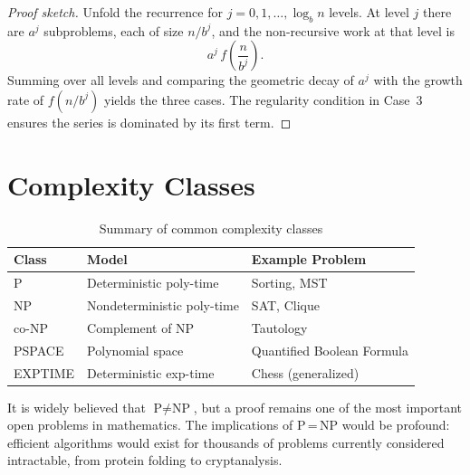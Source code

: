 \documentclass[
    language=english,
    doctype=book,
    institution=none,
    titlestyle=book
]{../../omnilatex}
\begin{document}
\begin{proof}[Proof sketch]
Unfold the recurrence for $j = 0, 1, \dots, \log_b n$ levels. At level $j$ there are $a^j$ subproblems, each of size $n / b^j$, and the non-recursive work at that level is
\[
a^j \, f\!\left(\frac{n}{b^j}\right).
\]
Summing over all levels and comparing the geometric decay of $a^j$ with the growth rate of $f(n/b^j)$ yields the three cases. The regularity condition in Case~3 ensures the series is dominated by its first term.
\end{proof}

\chapter{Complexity Classes}\label{app:complexity}

\begin{table}[htbp]
\centering
\caption{Summary of common complexity classes}
\begin{tabular}{lll}
\toprule
\textbf{Class} & \textbf{Model} & \textbf{Example Problem} \\
\midrule
P        & Deterministic poly-time & Sorting, MST \\
NP       & Nondeterministic poly-time & SAT, Clique \\
co-NP    & Complement of NP         & Tautology \\
PSPACE   & Polynomial space         & Quantified Boolean Formula \\
EXPTIME  & Deterministic exp-time   & Chess (generalized) \\
\bottomrule
\end{tabular}
\end{table}

It is widely believed that $\text{P} \neq \text{NP}$, but a proof remains one of the most important open problems in mathematics. The implications of P\,=\,NP would be profound: efficient algorithms would exist for thousands of problems currently considered intractable, from protein folding to cryptanalysis.

\backmatter
\printbibliography
\end{document}
